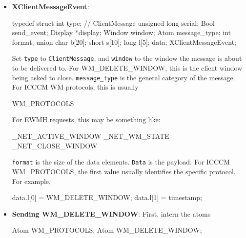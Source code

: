 \documentclass{report}
\begin{document}
\begin{itemize}
        \begin{verbatim}
            Client A calls XSendEvent
                    ↓
            X server delivers synthetic event
                    ↓
            Client B receives ClientMessage
        \end{verbatim}
        Client $A$ is often the WM, client $B$ is an application window.
    \item \textbf{XClientMessageEvent}: 
        \bigbreak \noindent 
        \begin{cppcode}
            typedef struct {
                int type;               // ClientMessage
                unsigned long serial;
                Bool send_event;
                Display *display;
                Window window;
                Atom message_type;
                int format;
                union {
                    char b[20];
                    short s[10];
                    long l[5];
                } data;
            } XClientMessageEvent;
        \end{cppcode}
        \bigbreak \noindent 
        Set \texttt{type} to \texttt{ClientMessage}, and \texttt{window} to the window the message is about to be delivered to. For WM\_DELETE\_WINDOW, this is the client window being asked to close.
        \bigbreak \noindent 
        \texttt{message\_type} is the general category of the message. For ICCCM WM protocols, this is usually 
        \bigbreak \noindent 
        \begin{cppcode}
        WM_PROTOCOLS
        \end{cppcode}
        \bigbreak \noindent 
        For EWMH requests, this may be something like:
        \bigbreak \noindent 
        \begin{cppcode}
            _NET_ACTIVE_WINDOW
            _NET_WM_STATE
            _NET_CLOSE_WINDOW
        \end{cppcode}
        \bigbreak \noindent 
        \texttt{format} is the size of the data elements. \texttt{Data} is the payload. For ICCCM WM\_PROTOCOLS, the first value usually identifies the specific protocol. For example,
        \bigbreak \noindent 
        \begin{cppcode}
            data.l[0] = WM_DELETE_WINDOW;
            data.l[1] = timestamp;
        \end{cppcode}
    \item \textbf{Sending WM\_DELETE\_WINDOW}: First, intern the atoms
        \bigbreak \noindent 
        \begin{cppcode}
            Atom WM_PROTOCOLS;
            Atom WM_DELETE_WINDOW;


\end{cppcode}
\end{itemize}
\end{document}
